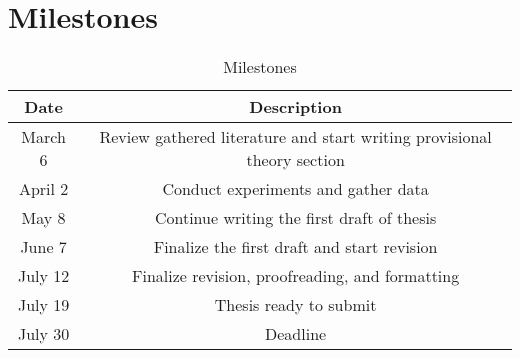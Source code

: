 \chapter{Milestones}

\begin{table}[!ht]
    \centering
    \begin{tabular}{c|c}
         \hline
         Date & Description \\
         \hline
         March 6 & Review gathered literature and start writing provisional theory section \\
         April 2 & Conduct experiments and gather data \\
         May 8 & Continue writing the first draft of thesis \\ 
         June 7 &  Finalize the first draft and start revision \\
         July 12 & Finalize revision, proofreading, and formatting \\
         July 19 & Thesis ready to submit \\ 
         July 30 & Deadline \\
         \hline
    \end{tabular}
    \caption{Milestones}
    \label{tab:Milestones}
\end{table}